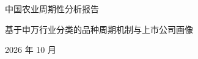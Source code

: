 \begin{titlepage}
\centering
\vspace*{4.2cm}

{\heiti{} 中国农业周期性分析报告}

\vspace{1.1cm}
{\heiti{} 基于申万行业分类的品种周期机制与上市公司画像}

\vfill
{\heiti{} 2026 年 10 月}
\vspace{2.5cm}
\end{titlepage}
